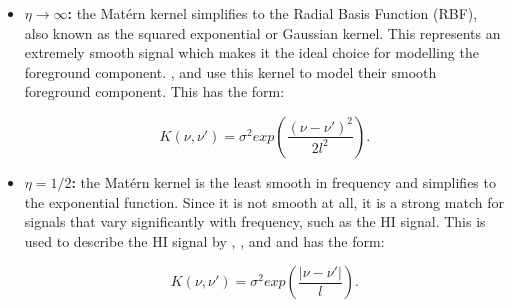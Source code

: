 \begin{itemize}

    \item \textbf{$\eta \rightarrow \infty$:} the Mat\'ern kernel simplifies to the Radial Basis Function (RBF), also known as the squared exponential or Gaussian kernel. This represents an extremely smooth signal which makes it the ideal choice for modelling the foreground component. \cite{kernGaussianProcessForeground2020}, \cite{mertensImprovedUpperLimits2020} and \cite{soaresGaussianProcessRegression2022} use this kernel to model their smooth foreground component. This has the form:

    \begin{equation}
        \label{eq:RBF}
        K(\nu, \nu') = \sigma^2 exp(\frac{(\nu - \nu')^2}{2l^2}).
    \end{equation}

    
    
    \item \textbf{$\eta = 1/2$:} the Mat\'ern kernel is the least smooth in frequency and simplifies to the exponential function. Since it is not smooth at all, it is a strong match for signals that vary significantly with frequency, such as the HI signal. This is used to describe the HI signal by \cite{kernGaussianProcessForeground2020}, \cite{mertensImprovedUpperLimits2020}, and \cite{soaresGaussianProcessRegression2022} and has the form: 

    \begin{equation}
        \label{eq:exp}
        K(\nu, \nu') = \sigma^2exp(\frac{|\nu - \nu'|}{l}).
    \end{equation}
    
\end{itemize}

